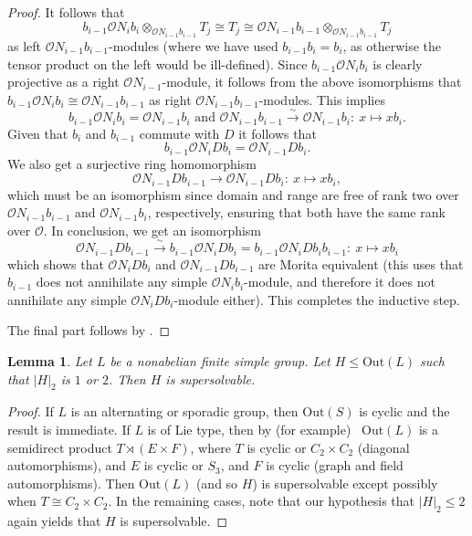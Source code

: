 \documentclass{amsart}
\theoremstyle{plain}\newtheorem{Theorem}{Theorem}[section]
\theoremstyle{plain}\newtheorem{Conjecture}[Theorem]{Conjecture}
\theoremstyle{plain}\newtheorem{Corollary}[Theorem]{Corollary}
\theoremstyle{plain}\newtheorem{Lemma}[Theorem]{Lemma}
\theoremstyle{plain}\newtheorem{Proposition}[Theorem]{Proposition}
\theoremstyle{definition}\newtheorem{Definition}[Theorem]{Definition}
\theoremstyle{definition}\newtheorem{Example}[Theorem]{Example}
\theoremstyle{definition}\newtheorem{Examples}[Theorem]{Examples}
\theoremstyle{definition}\newtheorem{Exercise}[Theorem]{Exercise}
\theoremstyle{definition}\newtheorem{Notation}[Theorem]{Notation}
\theoremstyle{definition}\newtheorem{Remark}[Theorem]{Remark}
\theoremstyle{definition}\newtheorem{Remarks}[Theorem]{Remarks}
\def\CO{{\mathcal{O}}}    \def\OPE{{\mathcal{O}(P\rtimes E)}}
\def\Out{\mathrm{Out}}
\numberwithin{equation}{section}
\begin{document}
\begin{proof}
It follows that $$b_{i-1}\CO N_i b_i \otimes_{\CO N_{i-1} b_{i-1}} T_j \cong T_j \cong \CO N_{i-1} b_{i-1} \otimes_{\CO N_{i-1} b_{i-1}} T_j$$ as left $\CO N_{i-1}b_{i-1}$-modules (where we have used $b_{i-1} b_i=b_i$, as otherwise the tensor product on the left would be ill-defined). Since $b_{i-1}\CO N_ib_i$ is clearly projective as a right $\CO N_{i-1}$-module, it follows from the above isomorphisms that $b_{i-1}\CO N_ib_i\cong \CO N_{i-1}b_{i-1}$ as right $\CO N_{i-1}b_{i-1}$-modules. This implies 
$$b_{i-1}\CO N_i b_{i}= \CO N_{i-1}b_{i}\textrm{ and } \CO N_{i-1} b_{i-1}\stackrel{\sim}{\longrightarrow} \CO N_{i-1}b_i: \ x \mapsto xb_i.$$
Given that $b_i$ and $b_{i-1}$ commute with $D$ it follows that
  $$b_{i-1}\CO N_iD b_i = \CO N_{i-1}D b_i.$$
  We also get a surjective ring homomorphism 
  $$
  \CO N_{i-1} D b_{i-1}\stackrel{}{\longrightarrow} \CO N_{i-1} D b_i: \ x \mapsto xb_i,
  $$
  which must be an isomorphism since domain and range are free of rank two over $\CO N_{i-1} b_{i-1}$ and $\CO N_{i-1}b_i$, respectively, ensuring that both have the same rank over $\CO$. 
  In conclusion, we get an isomorphism
  $$
  \CO N_{i-1} D b_{i-1}\stackrel{\sim}{\longrightarrow} b_{i-1}\CO N_{i} D b_i =b_{i-1}\CO N_{i} D b_i b_{i-1}:\ x \mapsto xb_i 
  $$
  which shows that $\CO N_{i} D b_i$ and $\CO N_{i-1}Db_{i-1}$ are Morita equivalent (this uses that $b_{i-1}$ does not annihilate any simple $\CO N_i b_i$-module, and therefore it does not annihilate any simple $\CO N_{i} D b_i$-module either). This completes the inductive step.

  The final part follows by .
\end{proof}

\begin{Lemma}
Let $L$ be a nonabelian finite simple group. Let $H \leq \Out(L)$ such that $|H|_2$ is $1$ or $2$. Then $H$ is supersolvable.    
\end{Lemma}

\begin{proof}
If $L$ is an alternating or sporadic group, then $\Out(S)$ is cyclic and the result is immediate. If $L$ is of Lie type, then by (for example)~\cite[Thm.~2.5.12]{GLS3} $\Out(L)$ is a semidirect product $T \rtimes (E \times F)$, where $T$ is cyclic or $C_2 \times C_2$ (diagonal automorphisms), and $E$ is cyclic or $S_3$, and $F$ is cyclic (graph and field automorphisms). Then $\Out(L)$ (and so $H$) is supersolvable except possibly when $T \cong C_2 \times C_2$. In the remaining cases, note that our hypothesis that $|H|_2\leq 2$ again yields that $H$ is supersolvable.
\end{proof}
\end{document}
